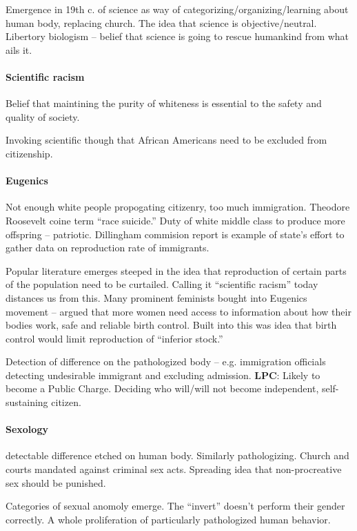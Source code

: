 Emergence in 19th c. of science as way of categorizing/organizing/learning about human body, replacing church. The idea that science is objective/neutral. Libertory biologism -- belief that science is going to rescue humankind from what ails it.

\paragraph{Scientific racism} Belief that maintining the purity of whiteness is essential to the safety and quality of society.

Invoking scientific though that African Americans need to be excluded from citizenship.

\paragraph{Eugenics} Not enough white people propogating citizenry, too much immigration. Theodore Roosevelt coine term ``race suicide.'' Duty of white middle class to produce more offspring -- patriotic. Dillingham commision report is example of state's effort to gather data on reproduction rate of immigrants.

Popular literature emerges steeped in the idea that reproduction of certain parts of the population need to be curtailed. Calling it ``scientific racism'' today distances us from this. Many prominent feminists bought into Eugenics movement -- argued that more women need access to information about how their bodies work, safe and reliable birth control. Built into this was idea that birth control would limit reproduction of ``inferior stock.''

Detection of difference on the pathologized body -- e.g. immigration officials detecting undesirable immigrant and excluding admission. \textbf{LPC}: Likely to become a Public Charge. Deciding who will/will not become independent, self-sustaining citizen.

\paragraph{Sexology} detectable difference etched on human body. Similarly pathologizing. Church and courts mandated against criminal sex acts. Spreading idea that non-procreative sex should be punished.

Categories of sexual anomoly emerge. The ``invert'' doesn't perform their gender correctly. A whole proliferation of particularly pathologized human behavior.

